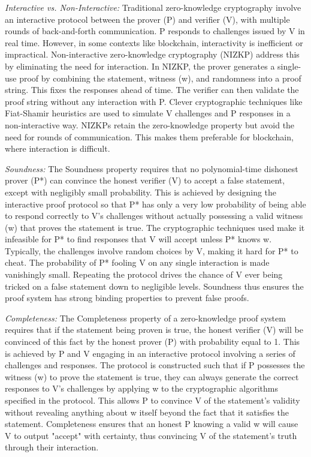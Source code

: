 \documentclass[conference]{IEEEtran}
\begin{document}
\textit{Interactive vs. Non-Interactive:}  Traditional zero-knowledge cryptography involve an interactive protocol between the prover (P) and verifier (V), with multiple rounds of back-and-forth communication. P responds to challenges issued by V in real time. However, in some contexts like blockchain, interactivity is inefficient or impractical. Non-interactive zero-knowledge cryptography (NIZKP) address this by eliminating the need for interaction. In NIZKP, the prover generates a single-use proof by combining the statement, witness (w), and randomness into a proof string. This fixes the responses ahead of time. The verifier can then validate the proof string without any interaction with P. Clever cryptographic techniques like Fiat-Shamir heuristics are used to simulate V challenges and P responses in a non-interactive way. NIZKPs retain the zero-knowledge property but avoid the need for rounds of communication. This makes them preferable for blockchain, where interaction is difficult.

\textit{Soundness:} The Soundness property requires that no polynomial-time dishonest prover (P*) can convince the honest verifier (V) to accept a false statement, except with negligibly small probability. This is achieved by designing the interactive proof protocol so that P* has only a very low probability of being able to respond correctly to V's challenges without actually possessing a valid witness (w) that proves the statement is true. The cryptographic techniques used make it infeasible for P* to find responses that V will accept unless P* knows w. Typically, the challenges involve random choices by V, making it hard for P* to cheat. The probability of P* fooling V on any single interaction is made vanishingly small. Repeating the protocol drives the chance of V ever being tricked on a false statement down to negligible levels. Soundness thus ensures the proof system has strong binding properties to prevent false proofs.

\textit{Completeness:} The Completeness property of a zero-knowledge proof system requires that if the statement being proven is true, the honest verifier (V) will be convinced of this fact by the honest prover (P) with probability equal to 1. This is achieved by P and V engaging in an interactive protocol involving a series of challenges and responses. The protocol is constructed such that if P possesses the witness (w) to prove the statement is true, they can always generate the correct responses to V's challenges by applying w to the cryptographic algorithms specified in the protocol. This allows P to convince V of the statement's validity without revealing anything about w itself beyond the fact that it satisfies the statement. Completeness ensures that an honest P knowing a valid w will cause V to output "accept" with certainty, thus convincing V of the statement's truth through their interaction.
\end{document}

